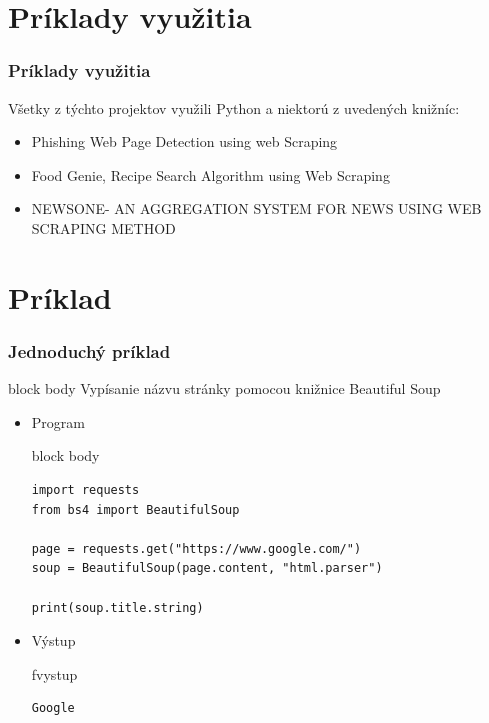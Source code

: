 \documentclass{beamer}
\newcommand{\ssection}[1]{
	\section{#1}
	\begin{frame}[fragile=singleslide]\frametitle{}
	\Huge #1
	\end{frame}
}
\newenvironment{program}{\begin{beamercolorbox}[rounded=true,shadow=true]{block body}\vspace{-4mm}}{\vspace{-2mm}\end{beamercolorbox}}
\newenvironment{vystup}{\begin{beamercolorbox}[rounded=true,shadow=true]{fvystup}}{\end{beamercolorbox}}
\newenvironment{poznamka}{\begin{beamercolorbox}[rounded=true,shadow=false]{block body}}{\end{beamercolorbox}}
\begin{document}
\section{Príklady využitia}

\begin{frame}[fragile=singleslide]\frametitle{Príklady využitia}
Všetky z týchto projektov využili Python a niektorú z uvedených knižníc:
\begin{itemize}
\item Phishing Web Page Detection using web Scraping
\item Food Genie, Recipe Search Algorithm using Web Scraping
\item NEWSONE- AN AGGREGATION SYSTEM FOR NEWS USING WEB SCRAPING METHOD
\end{itemize}
\end{frame}


\section{Príklad}
\begin{frame}[fragile=singleslide]\frametitle{Jednoduchý príklad}
\begin{poznamka}
Vypísanie názvu stránky pomocou knižnice Beautiful Soup
\end{poznamka}

\begin{itemize}
\item Program

\begin{program}
\begin{lstlisting}
import requests
from bs4 import BeautifulSoup

page = requests.get("https://www.google.com/")
soup = BeautifulSoup(page.content, "html.parser")

print(soup.title.string)
\end{lstlisting}
\end{program}

\item Výstup
\begin{vystup}
\begin{lstlisting}
Google
\end{lstlisting}
\end{vystup}

\end{itemize}
\end{frame}
\end{document}
